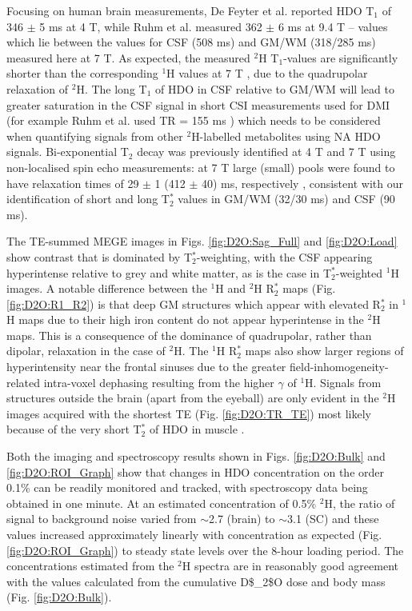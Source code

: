 Focusing on human brain measurements, De Feyter et al. \cite{DeFeyter2018DeuteriumVivo} reported HDO T$_1$ of 346 $\pm$ 5 ms at 4 T, while Ruhm et al. \cite{Ruhm2021DeuteriumResolution} measured 362 $\pm$ 6 ms at 9.4 T – values which lie between the values for \ac{CSF} (508 ms) and \ac{GM}/\ac{WM} (318/285 ms) measured here at 7 T. As expected, the measured $^2$H T$_1$-values are significantly shorter than the corresponding $^1$H values at 7 T \cite{Peters2007T27T}, due to the quadrupolar relaxation of $^2$H. The long T$_1$ of \ac{HDO} in \ac{CSF} relative to \ac{GM}/\ac{WM} will lead to greater saturation in the \ac{CSF} signal in short \ac{CSI} measurements used for \ac{DMI} (for example Ruhm et al. used TR = 155 ms \cite{Ruhm2021DeuteriumResolution}) which needs to be considered when quantifying signals from other $^2$H-labelled metabolites using \ac{NA} \ac{HDO} signals. Bi-exponential T$_2$ decay was previously identified at 4 T \cite{DeFeyter2018DeuteriumVivo} and 7 T \cite{Roig2022Deuterium7T} using non-localised spin echo measurements: at 7 T  large (small) pools were found to have relaxation times of 29 $\pm$ 1 (412 $\pm$ 40) ms, respectively \cite{Roig2022Deuterium7T}, consistent with our identification of short and long T$_2^*$ values in \ac{GM}/\ac{WM} (32/30 ms) and \ac{CSF} (90 ms). 

The \ac{TE}-summed \ac{MEGE} images in Figs. \ref{fig:D2O:Sag_Full} and \ref{fig:D2O:Load} show contrast that is dominated by T$_2^*$-weighting, with the \ac{CSF} appearing hyperintense relative to grey and white matter, as is the case in T$_2^*$-weighted $^1$H images. A notable difference between the $^1$H and $^2$H R$_2^*$ maps (Fig. \ref{fig:D2O:R1_R2}) is that deep \ac{GM} structures which appear with elevated R$_2^*$ in $^1$H maps due to their high iron content \cite{Peters2007T27T} do not appear hyperintense in the $^2$H maps. This is a consequence of the dominance of quadrupolar, rather than dipolar, relaxation in the case of $^2$H. The $^1$H R$_2^*$ maps also show larger regions of hyperintensity near the frontal sinuses due to the greater field-inhomogeneity-related intra-voxel dephasing resulting from the higher $\gamma$ of $^1$H. Signals from structures outside the brain (apart from the eyeball) are only evident in the $^2$H images acquired with the shortest \ac{TE} (Fig. \ref{fig:D2O:TR_TE}) most likely because of the very short T$_2^*$ of \ac{HDO} in muscle \cite{Gursan2022ResidualMuscle,Damion2021NaturalT}.

Both the imaging and spectroscopy results shown in Figs. \ref{fig:D2O:Bulk} and \ref{fig:D2O:ROI_Graph} show that changes in \ac{HDO} concentration on the order 0.1\% can be readily monitored and tracked, with spectroscopy data being obtained in one minute. At an estimated concentration of 0.5\% $^2$H, the ratio of signal to background noise varied from $\sim$2.7 (brain) to $\sim$3.1 (\ac{SC}) and these values increased approximately linearly with concentration as expected (Fig. \ref{fig:D2O:ROI_Graph}) to steady state levels over the 8-hour loading period. The concentrations estimated from the $^2$H spectra are in reasonably good agreement with the values calculated from the cumulative \ac{D$_2$O} dose and body mass (Fig. \ref{fig:D2O:Bulk}). 

